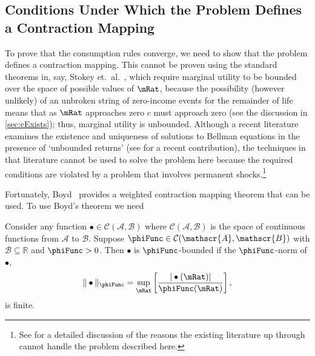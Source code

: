 \documentclass[titlepage]{\econtex}\providecommand{\texname}{BufferStockTheory}%
\begin{document}
\begin{comment}
If the FHWC does not hold, we make do with a less useful bound on the minimal MPC: It is
weakly greater than zero, which follows from the logic in
\ref{sec:cExists}; hence the `max' in \eqref{eq:MinMinMPCDef}.
\end{comment}


\subsection{Conditions Under Which the Problem Defines a Contraction Mapping}

\label{subsec:contraction}

To prove that the consumption rules converge, we need to show that the
problem defines a contraction mapping. This cannot be proven using the
standard theorems in, say, Stokey et.\ al.~\citeyearpar{slpMethods},
which require marginal utility to be bounded over the space of
possible values of $\mRat$, because the possibility (however unlikely)
of an unbroken string of zero-income events for the remainder of life
means that as $\mRat$ approaches zero $c$ must approach zero (see the
discussion in \ref{sec:cExists}); thus, marginal utility is unbounded.
Although a recent literature examines the existence and uniqueness 
of solutions to Bellman equations in the presence of `unbounded returns' (see
\cite{mnUnique} for a recent contribution), the techniques in that literature
cannot be used to solve the problem here because the required conditions 
are violated by a problem that involves permanent shocks.\footnote{See \cite{yaoNote}
for a detailed discussion of the reasons the existing literature up through \cite{mnUnique} cannot handle 
the problem described here.}

Fortunately, Boyd~\citeyearpar{jboyd:weighted} provides a weighted
contraction mapping theorem that can be used.  To use Boyd's theorem
we need
\begin{defn}
Consider any function $\bullet\in \mathcal{C}(\mathscr{A},\mathscr{B})$ where $\mathcal{C}(\mathscr{A},\mathscr{B})$ is the space of continuous functions from $\mathscr{A}$ to $%
\mathscr{B}$. Suppose $\phiFunc \in \mathcal{C}(\mathscr{A},\mathscr{B})$ with $%
\mathscr{B}\subseteq\mathbb{R}$ and $\phiFunc >0$. Then $\bullet$ is $\phiFunc$-bounded if the $\phiFunc$-norm of $\bullet$,
\begin{equation}
\Vert \bullet\Vert _{\phiFunc }=\sup_{\mRat}\left[ \frac{|\bullet(\mRat)|}{\phiFunc (\mRat)}\right] ,
\label{eq:phinorm}
\end{equation}%
is finite.
\end{defn}
\end{document}
